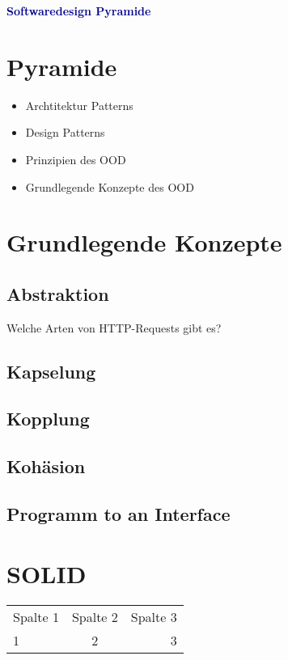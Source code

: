\textbf{\textcolor{darkblue}{ Softwaredesign Pyramide}}~

\section*{Pyramide}
\begin{itemize}
	\item Archtitektur Patterns
	\item Design Patterns
	\item Prinzipien des OOD
	\item Grundlegende Konzepte des OOD
	
\end{itemize}

\section*{Grundlegende Konzepte}
\subsection*{Abstraktion}
Welche Arten von HTTP-Requests gibt es?
\subsection*{Kapselung}
\subsection*{Kopplung}
\subsection*{Kohäsion}
\subsection*{Programm to an Interface}

\section*{SOLID}
\begin{tabular}{lcr}
   Spalte 1 & Spalte 2 & Spalte 3 \\
  1 & 2 & 3 \\
 \end{tabular}